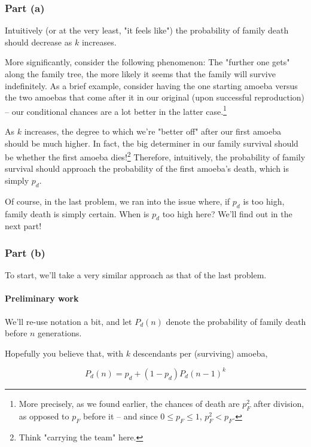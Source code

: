 \subsubsection{Part (a)}

Intuitively (or at the very least, "it feels like") the probability of family death should decrease as $k$ increases.

More significantly, consider the following phenomenon: The "further one gets" along the family tree, the more likely it seems that the family will survive indefinitely. As a brief example, consider having the one starting amoeba versus the two amoebas that come after it in our original (upon successful reproduction) -- our conditional chances are a lot better in the latter case.\footnote{More precisely, as we found earlier, the chances of death are $p_F^2$ after division, as opposed to $p_F$ before it -- and since $0 \leq p_F \leq 1$, $p_F^2 < p_F$.}

As $k$ increases, the degree to which we're "better off" after our first amoeba should be much higher. In fact, the big determiner in our family survival should be whether the first amoeba dies!\footnote{Think "carrying the team" here.} Therefore, intuitively, the probability of family survival should approach the probability of the first amoeba's death, which is simply $p_d$. 

Of course, in the last problem, we ran into the issue where, if $p_d$ is too high, family death is simply certain. When is $p_d$ too high here? We'll find out in the next part!

\subsubsection{Part (b)}

To start, we'll take a very similar approach as that of the last problem.

\paragraph{Preliminary work}

We'll re-use notation a bit, and let $P_d(n)$ denote the probability of family death before $n$ generations. 

Hopefully you believe that, with $k$ descendants per (surviving) amoeba, 

\begin{equation*}
P_d(n) = p_d + (1 - p_d) P_d(n-1)^k
\end{equation*}

